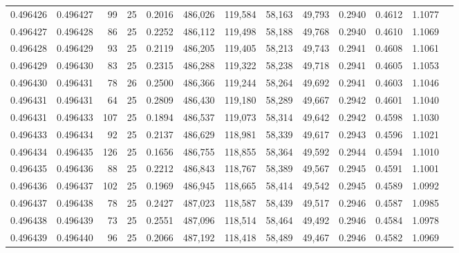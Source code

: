 \begin{tabular}{rrrrrrrrrrrrr}
0.496426 & 0.496427 &    99 &  25 &                                     0.2016 & 486,026 & 119,584 &  58,163 &  49,793 & 0.2940 & 0.4612 & 1.1077 \\
0.496427 & 0.496428 &    86 &  25 &                                     0.2252 & 486,112 & 119,498 &  58,188 &  49,768 & 0.2940 & 0.4610 & 1.1069 \\
0.496428 & 0.496429 &    93 &  25 &                                     0.2119 & 486,205 & 119,405 &  58,213 &  49,743 & 0.2941 & 0.4608 & 1.1061 \\
0.496429 & 0.496430 &    83 &  25 &                                     0.2315 & 486,288 & 119,322 &  58,238 &  49,718 & 0.2941 & 0.4605 & 1.1053 \\
0.496430 & 0.496431 &    78 &  26 &                                     0.2500 & 486,366 & 119,244 &  58,264 &  49,692 & 0.2941 & 0.4603 & 1.1046 \\
0.496431 & 0.496431 &    64 &  25 &                                     0.2809 & 486,430 & 119,180 &  58,289 &  49,667 & 0.2942 & 0.4601 & 1.1040 \\
0.496431 & 0.496433 &   107 &  25 &                                     0.1894 & 486,537 & 119,073 &  58,314 &  49,642 & 0.2942 & 0.4598 & 1.1030 \\
0.496433 & 0.496434 &    92 &  25 &                                     0.2137 & 486,629 & 118,981 &  58,339 &  49,617 & 0.2943 & 0.4596 & 1.1021 \\
0.496434 & 0.496435 &   126 &  25 &                                     0.1656 & 486,755 & 118,855 &  58,364 &  49,592 & 0.2944 & 0.4594 & 1.1010 \\
0.496435 & 0.496436 &    88 &  25 &                                     0.2212 & 486,843 & 118,767 &  58,389 &  49,567 & 0.2945 & 0.4591 & 1.1001 \\
0.496436 & 0.496437 &   102 &  25 &                                     0.1969 & 486,945 & 118,665 &  58,414 &  49,542 & 0.2945 & 0.4589 & 1.0992 \\
0.496437 & 0.496438 &    78 &  25 &                                     0.2427 & 487,023 & 118,587 &  58,439 &  49,517 & 0.2946 & 0.4587 & 1.0985 \\
0.496438 & 0.496439 &    73 &  25 &                                     0.2551 & 487,096 & 118,514 &  58,464 &  49,492 & 0.2946 & 0.4584 & 1.0978 \\
0.496439 & 0.496440 &    96 &  25 &                                     0.2066 & 487,192 & 118,418 &  58,489 &  49,467 & 0.2946 & 0.4582 & 1.0969 \\

\end{tabular}
